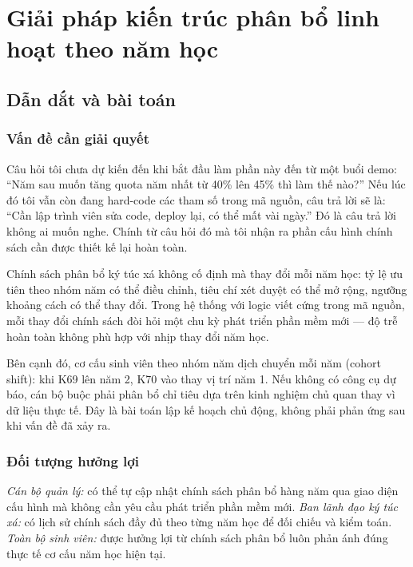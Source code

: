 \documentclass[../DoAn.tex]{subfiles}
\begin{document}
\section{Giải pháp kiến trúc phân bổ linh hoạt theo năm học}
\label{sec:contrib_policy}

\subsection{Dẫn dắt và bài toán}
\label{subsec:policy_problem}

\subsubsection{Vấn đề cần giải quyết}

Câu hỏi tôi chưa dự kiến đến khi bắt đầu làm phần này đến từ một buổi demo:
``Năm sau muốn tăng quota năm nhất từ 40\% lên 45\% thì làm thế nào?'' Nếu
lúc đó tôi vẫn còn đang hard-code các tham số trong mã nguồn, câu trả lời sẽ
là: ``Cần lập trình viên sửa code, deploy lại, có thể mất vài ngày.'' Đó là
câu trả lời không ai muốn nghe. Chính từ câu hỏi đó mà tôi nhận ra phần cấu
hình chính sách cần được thiết kế lại hoàn toàn.

Chính sách phân bổ ký túc xá không cố định mà thay đổi mỗi năm học: tỷ lệ
ưu tiên theo nhóm năm có thể điều chỉnh, tiêu chí xét duyệt có thể mở rộng,
ngưỡng khoảng cách có thể thay đổi. Trong hệ thống với logic viết cứng trong
mã nguồn, mỗi thay đổi chính sách đòi hỏi một chu kỳ phát triển phần mềm mới
--- độ trễ hoàn toàn không phù hợp với nhịp thay đổi năm học.

Bên cạnh đó, cơ cấu sinh viên theo nhóm năm dịch chuyển mỗi năm (cohort
shift): khi K69 lên năm 2, K70 vào thay vị trí năm 1. Nếu không có công cụ
dự báo, cán bộ buộc phải phân bổ chỉ tiêu dựa trên kinh nghiệm chủ quan thay
vì dữ liệu thực tế. Đây là bài toán lập kế hoạch chủ động, không phải phản
ứng sau khi vấn đề đã xảy ra.

\subsubsection{Đối tượng hưởng lợi}

\textit{Cán bộ quản lý:} có thể tự cập nhật chính sách phân bổ hàng năm qua
giao diện cấu hình mà không cần yêu cầu phát triển phần mềm mới. \textit{Ban
lãnh đạo ký túc xá:} có lịch sử chính sách đầy đủ theo từng năm học để đối
chiếu và kiểm toán. \textit{Toàn bộ sinh viên:} được hưởng lợi từ chính sách
phân bổ luôn phản ánh đúng thực tế cơ cấu năm học hiện tại.
\end{document}
